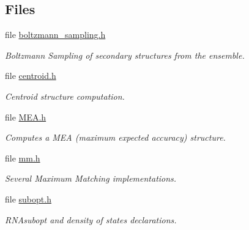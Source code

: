 \subsection*{Files}
\begin{DoxyCompactItemize}
\item 
file \hyperlink{boltzmann__sampling_8h}{boltzmann\+\_\+sampling.\+h}
\begin{DoxyCompactList}\small\item\em Boltzmann Sampling of secondary structures from the ensemble. \end{DoxyCompactList}\item 
file \hyperlink{centroid_8h}{centroid.\+h}
\begin{DoxyCompactList}\small\item\em Centroid structure computation. \end{DoxyCompactList}\item 
file \hyperlink{MEA_8h}{M\+E\+A.\+h}
\begin{DoxyCompactList}\small\item\em Computes a M\+EA (maximum expected accuracy) structure. \end{DoxyCompactList}\item 
file \hyperlink{mm_8h}{mm.\+h}
\begin{DoxyCompactList}\small\item\em Several Maximum Matching implementations. \end{DoxyCompactList}\item 
file \hyperlink{subopt_8h}{subopt.\+h}
\begin{DoxyCompactList}\small\item\em R\+N\+Asubopt and density of states declarations. \end{DoxyCompactList}\end{DoxyCompactItemize}
